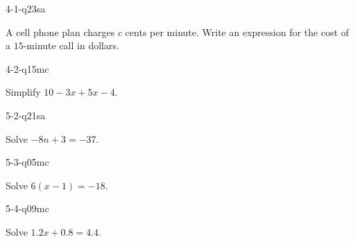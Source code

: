 \begin{practiceQuestion}{4-1-q23}{sa}
\begin{questionText}
A cell phone plan charges $c$ cents per minute. Write an expression for the cost of a $15$-minute call in dollars.
\end{questionText}
\end{practiceQuestion}

\begin{practiceQuestion}{4-2-q15}{mc}
\begin{questionText}
Simplify $10 - 3x + 5x - 4$.
\end{questionText}
\end{practiceQuestion}

\begin{practiceQuestion}{5-2-q21}{sa}
\begin{questionText}
Solve $-8n + 3 = -37$.
\end{questionText}
\end{practiceQuestion}

\begin{practiceQuestion}{5-3-q05}{mc}
\begin{questionText}
Solve $6(x - 1) = -18$.
\end{questionText}
\end{practiceQuestion}

\begin{practiceQuestion}{5-4-q09}{mc}
\begin{questionText}
Solve $1.2x + 0.8 = 4.4$.
\end{questionText}
\end{practiceQuestion}

